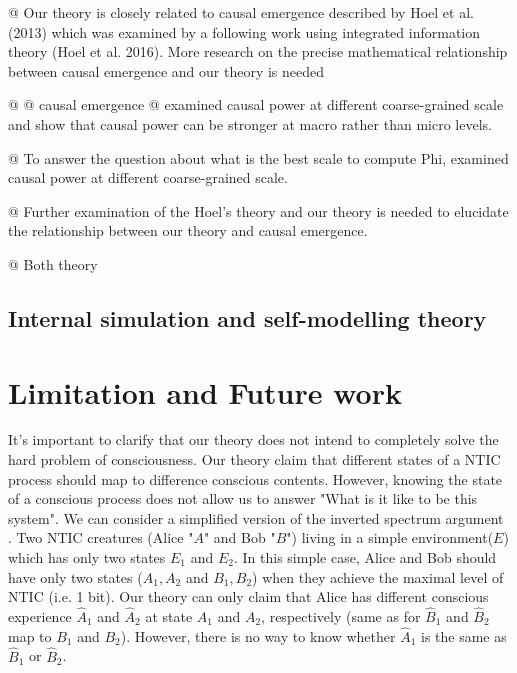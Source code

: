 \documentclass[utf8]{article}
\begin{document}
				\begin{ants}
				
				    @ Our theory is closely related to causal emergence described by Hoel et al. (2013) which was examined by a following work using integrated information theory (Hoel et al. 2016). More research on the precise mathematical relationship between causal emergence and our theory is needed
				    
					@ \cite{hoel2016can}
					@ causal emergence
					@ \cite{hoel2013quantifying} examined causal power at different coarse-grained scale and show that causal power can be stronger at macro rather than micro levels.


					@ To answer the question about what is the best scale to compute Phi, \cite{hoel2016can} examined causal power at different coarse-grained scale.

					@ Further examination of the Hoel's theory and our theory is needed to elucidate the relationship between our theory and causal emergence.
					
					@ Both theory 


				\end{ants}

        
		\subsection{Internal simulation and self-modelling theory}



    \section{Limitation and Future work}
        It's important to clarify that our theory does not intend to completely solve the hard problem of consciousness\citep{chalmers1995facing}. Our theory claim that different states of a NTIC process should map to difference conscious contents. However, knowing the state of a conscious process does not allow us to answer "What is it like to be this system"\citep{nagel1974like}. We can consider a simplified version of the inverted spectrum argument \citep{Shoemaker1982-SHOTIS, Block1990-BLOIE, Locke1979-LOCTCE-2}. Two NTIC creatures (Alice "$A$" and Bob "$B$") living in a simple environment($E$) which has only two states $E_1$ and $E_2$. In this simple case, Alice and Bob should have only two states ($A_1, A_2$ and $B_1, B_2$) when they achieve the maximal level of NTIC (i.e. 1 bit). Our theory can only claim that Alice has different conscious experience $\hat{A}_1$ and $\hat{A}_2$ at state $A_1$ and $A_2$, respectively (same as for $\hat{B}_1$ and $\hat{B}_2$ map to $B_1$ and $B_2$). However, there is no way to know whether $\hat{A}_1$ is the same as $\hat{B}_1$ or $\hat{B}_2$. 
        
\end{document}
